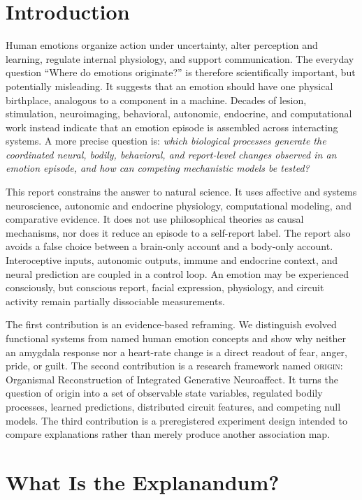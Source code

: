 \documentclass[conference]{IEEEtran}
\newcommand{\origin}{\textsc{origin}}
\begin{document}
\section{Introduction}

Human emotions organize action under uncertainty, alter perception and learning, regulate internal physiology, and support communication. The everyday question ``Where do emotions originate?'' is therefore scientifically important, but potentially misleading. It suggests that an emotion should have one physical birthplace, analogous to a component in a machine. Decades of lesion, stimulation, neuroimaging, behavioral, autonomic, endocrine, and computational work instead indicate that an emotion episode is assembled across interacting systems. A more precise question is: \emph{which biological processes generate the coordinated neural, bodily, behavioral, and report-level changes observed in an emotion episode, and how can competing mechanistic models be tested?}

This report constrains the answer to natural science. It uses affective and systems neuroscience, autonomic and endocrine physiology, computational modeling, and comparative evidence. It does not use philosophical theories as causal mechanisms, nor does it reduce an episode to a self-report label. The report also avoids a false choice between a brain-only account and a body-only account. Interoceptive inputs, autonomic outputs, immune and endocrine context, and neural prediction are coupled in a control loop. An emotion may be experienced consciously, but conscious report, facial expression, physiology, and circuit activity remain partially dissociable measurements.

The first contribution is an evidence-based reframing. We distinguish evolved functional systems from named human emotion concepts and show why neither an amygdala response nor a heart-rate change is a direct readout of fear, anger, pride, or guilt. The second contribution is a research framework named \origin{}: Organismal Reconstruction of Integrated Generative Neuroaffect. It turns the question of origin into a set of observable state variables, regulated bodily processes, learned predictions, distributed circuit features, and competing null models. The third contribution is a preregistered experiment design intended to compare explanations rather than merely produce another association map.

\section{What Is the Explanandum?}
\end{document}
